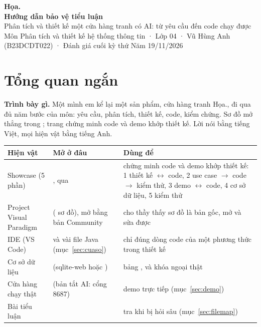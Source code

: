 \begin{center}
{\color{accent}\fontsize{28}{32}\selectfont\bfseries Họa.}\\[2pt]
{\LARGE\bfseries Hướng dẫn bảo vệ tiểu luận}\\[2pt]
{\normalsize Phân tích và thiết kế một cửa hàng tranh có AI: từ yêu cầu đến code chạy được}\\[4pt]
{\small Môn Phân tích và thiết kế hệ thống thông tin · Lớp 04 · Vũ Hùng Anh (B23DCDT022) · Đánh giá cuối kỳ thứ Năm 19/11/2026}
\end{center}

\section{Tổng quan ngắn}\label{sec:tongquan}
\textbf{Trình bày gì.} Một mình em kể lại một sản phẩm, cửa hàng tranh Họa., đi qua đủ năm bước của môn: yêu cầu, phân tích, thiết kế, code, kiểm chứng.  Sơ đồ mở thẳng trong ; trang  chứng minh code và demo khớp thiết kế. Lời nói bằng tiếng Việt, mọi hiện vật bằng tiếng Anh.

\begin{center}\small
\begin{tabular}{@{}P{3.1cm}P{6.6cm}P{6.6cm}@{}}
\toprule
\textbf{Hiện vật} & \textbf{Mở ở đâu} & \textbf{Dùng để}\\
\midrule
Showcase (5 phần) & , qua  & chứng minh code và demo khớp thiết kế: 1 thiết kế $\leftrightarrow$ code, 2 use case $\to$ code $\to$ kiểm thử, 3 demo $\leftrightarrow$ code, 4 cơ sở dữ liệu, 5 kiểm thử\\
Project Visual Paradigm &  (\factDiagrams{} sơ đồ), mở bằng bản Community & cho thầy thấy sơ đồ là bản gốc, mở và sửa được\\
IDE (VS Code) &  và vài file Java (mục~\ref{sec:cuaso}) & chỉ đúng dòng code của một phương thức trong thiết kế\\
Cơ sở dữ liệu &  (sqlite-web hoặc ) & bảng ,  và khóa ngoại thật\\
Cửa hàng chạy thật &  (bản tắt AI: cổng 8687) & demo trực tiếp (mục~\ref{sec:demo})\\
Bài tiểu luận &  & tra khi bị hỏi sâu (mục~\ref{sec:filemap})\\
\bottomrule
\end{tabular}
\end{center}

